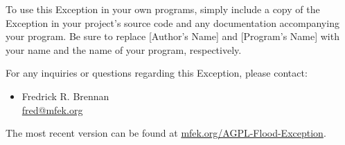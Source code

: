 \documentclass[12pt]{article}
\begin{document}
To use this Exception in your own programs, simply include a copy of the Exception in your project's source code and any documentation accompanying your program. Be sure to replace [Author's Name] and [Program's Name] with your name and the name of your program, respectively.

For any inquiries or questions regarding this Exception, please contact:

\begin{itemize}
	\item Fredrick R. Brennan \\
\href{mailto:fred@mfek.org}{fred@mfek.org}
\end{itemize}

The most recent version can be found at \url{mfek.org/AGPL-Flood-Exception}.
\end{document}
